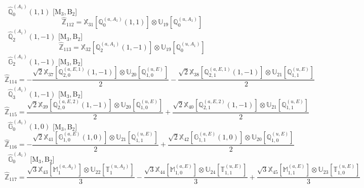 \documentclass[fleqn,10pt,landscape]{article}
\begin{document}
\begin{itemize}
\begin{dmath*}
\end{dmath*}
\vspace{4mm}
\noindent {} $\,\,\,\hat{\mathbb{Q}}_{0}^{(A_{1})}(1,1)$ [M$_{3}$,\,B$_{2}$]
\begin{dmath*}
\hat{\mathbb{Z}}_{112}=\mathbb{X}_{31}[\mathbb{Q}_{0}^{(a,A_{1})}(1,1)] \otimes\mathbb{U}_{19}[\mathbb{Q}_{0}^{(u,A_{1})}]
\end{dmath*}
\vspace{4mm}
\noindent {} $\,\,\,\hat{\mathbb{Q}}_{2}^{(A_{1})}(1,-1)$ [M$_{3}$,\,B$_{2}$]
\begin{dmath*}
\hat{\mathbb{Z}}_{113}=\mathbb{X}_{32}[\mathbb{Q}_{2}^{(a,A_{1})}(1,-1)] \otimes\mathbb{U}_{19}[\mathbb{Q}_{0}^{(u,A_{1})}]
\end{dmath*}
\vspace{4mm}
\noindent {} $\,\,\,\hat{\mathbb{G}}_{2}^{(A_{1})}(1,-1)$ [M$_{3}$,\,B$_{2}$]
\begin{dmath*}
\hat{\mathbb{Z}}_{114}=- \frac{\sqrt{2} \mathbb{X}_{37}[\mathbb{Q}_{2,0}^{(a,E,1)}(1,-1)] \otimes\mathbb{U}_{20}[\mathbb{Q}_{1,0}^{(u,E)}]}{2} - \frac{\sqrt{2} \mathbb{X}_{38}[\mathbb{Q}_{2,1}^{(a,E,1)}(1,-1)] \otimes\mathbb{U}_{21}[\mathbb{Q}_{1,1}^{(u,E)}]}{2}
\end{dmath*}
\vspace{4mm}
\noindent {} $\,\,\,\hat{\mathbb{Q}}_{3}^{(A_{1})}(1,-1)$ [M$_{3}$,\,B$_{2}$]
\begin{dmath*}
\hat{\mathbb{Z}}_{115}=\frac{\sqrt{2} \mathbb{X}_{39}[\mathbb{Q}_{2,0}^{(a,E,2)}(1,-1)] \otimes\mathbb{U}_{20}[\mathbb{Q}_{1,0}^{(u,E)}]}{2} + \frac{\sqrt{2} \mathbb{X}_{40}[\mathbb{Q}_{2,1}^{(a,E,2)}(1,-1)] \otimes\mathbb{U}_{21}[\mathbb{Q}_{1,1}^{(u,E)}]}{2}
\end{dmath*}
\vspace{4mm}
\noindent {} $\,\,\,\hat{\mathbb{G}}_{0}^{(A_{1})}(1,0)$ [M$_{3}$,\,B$_{2}$]
\begin{dmath*}
\hat{\mathbb{Z}}_{116}=- \frac{\sqrt{2} \mathbb{X}_{41}[\mathbb{G}_{1,0}^{(a,E)}(1,0)] \otimes\mathbb{U}_{21}[\mathbb{Q}_{1,1}^{(u,E)}]}{2} + \frac{\sqrt{2} \mathbb{X}_{42}[\mathbb{G}_{1,1}^{(a,E)}(1,0)] \otimes\mathbb{U}_{20}[\mathbb{Q}_{1,0}^{(u,E)}]}{2}
\end{dmath*}
\vspace{4mm}
\noindent {} $\,\,\,\hat{\mathbb{G}}_{0}^{(A_{1})}$ [M$_{3}$,\,B$_{2}$]
\begin{dmath*}
\hat{\mathbb{Z}}_{117}=\frac{\sqrt{3} \mathbb{X}_{43}[\mathbb{M}_{1}^{(a,A_{2})}] \otimes\mathbb{U}_{22}[\mathbb{T}_{1}^{(u,A_{2})}]}{3} - \frac{\sqrt{3} \mathbb{X}_{44}[\mathbb{M}_{1,0}^{(a,E)}] \otimes\mathbb{U}_{24}[\mathbb{T}_{1,1}^{(u,E)}]}{3} + \frac{\sqrt{3} \mathbb{X}_{45}[\mathbb{M}_{1,1}^{(a,E)}] \otimes\mathbb{U}_{23}[\mathbb{T}_{1,0}^{(u,E)}]}{3}

\end{dmath*}
\end{itemize}
\end{document}
